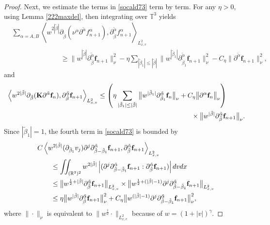\documentclass[reqno]{amsart}
\numberwithin{equation}{section}
\numberwithin{equation}{section}
\begin{document}
\begin{proof}
		
		‌Next, we estimate the terms in \eqref{socald73} term by term. For any \(\eta > 0\), using Lemma \ref{222maxdel}, then integrating over \(\mathbb{T}^3\) yields
		\begin{align*}
			&\sum_{\alpha=A,B}\left\langle w^{2|\tilde{\beta}|}\partial_{\tilde{\beta}} (\nu^{\alpha}\partial^{\tilde{\alpha}} f_{n+1}^{\alpha}), \partial_{\tilde{\beta}}^{\tilde{\alpha}} f_{n+1}^{\alpha} \right\rangle_{L^{2}_{x,v}} \\
			&\hspace{3cm}\geq \big\|w^{|\tilde{\beta}|}\partial_{\tilde{\beta}}^{\tilde{\alpha}} \mathbf{f}_{n+1}\big\|^2_{\nu} - \eta \sum_{|\tilde{\beta}_1| \leq |\tilde{\beta}|} \big\|w^{|\tilde{\beta}_1|}\partial_{\tilde{\beta}_1}^{\tilde{\alpha}} \mathbf{f}_{n+1}\big\|^2_{\nu} - C_\eta \big\|\partial^{\tilde{\alpha}} \mathbf{f}_{n+1}\big\|^2_{\nu},
		\end{align*}
		and
		\begin{align*}
		&\left\langle w^{2|\tilde{\beta}|}\partial_{\tilde{\beta}} (\mathbf{K}\partial^{\tilde{\alpha}} \mathbf{f}_n), \partial_{\tilde{\beta}}^{\tilde{\alpha}} \mathbf{f}_{n+1}\right\rangle_{L^{2}_{x,v}} \le \left( \eta\sum_{|\tilde{\beta}_1| \le |\tilde{\beta}|} \big\|w^{|\tilde{\beta}_1|}\partial_{\tilde{\beta}_1}^{\tilde{\alpha}} \mathbf{f}_{n}\big\|_{\nu} + C_\eta \big\|\partial^\alpha \mathbf{f}_{n}\big\|_{\nu} \right)\\ 
		&\hspace{9.6cm}\times \big\|w^{|\tilde{\beta}|}\partial_{\tilde{\beta}}^{\tilde{\alpha}} \mathbf{f}_{n+1}\big\|_{\nu}.
		\end{align*}
		Since \(|\tilde{\beta}_1| = 1\), the fourth term in \eqref{socald73} is bounded by
		\begin{align*}
		&C\left\langle w^{2|\tilde{\beta}|}(\partial_{\tilde{\beta}_1}v_j)\partial^j \partial^{\tilde{\alpha}}_{\tilde{\beta}-\tilde{\beta}_1} \mathbf{f}_{n+1}, \partial_{\tilde{\beta}}^{\tilde{\alpha}} \mathbf{f}_{n+1}\right\rangle_{L^{2}_{x,v}}\\
		&\hspace{0.7cm}\leq \iint_{(\mathbb{R}^3)^2} w^{2|\tilde{\beta}|} \left|(\partial^j \partial^{\tilde{\alpha}}_{\tilde{\beta}-\tilde{\beta}_1} \mathbf{f}_{n+1}: \partial_{\tilde{\beta}}^{\tilde{\alpha}} \mathbf{f}_{n+1})\right| dv dx\\
		&\hspace{0.7cm}\leq \big\|w^{\frac{1}{2} + |\tilde{\beta}|}\partial_{\tilde{\beta}}^{\tilde{\alpha}} \mathbf{f}_{n+1}\big\|_{L^{2}_{x,v}} \times \big\|w^{\frac{1}{2} + (|\tilde{\beta}| - 1)}\partial^j \partial^{\tilde{\alpha}}_{\tilde{\beta}-\tilde{\beta}_1} \mathbf{f}_{n+1}\big\|_{L^{2}_{x,v}}\\
		&\hspace{0.7cm}\leq \eta \big\|w^{ |\tilde{\beta}|}\partial_{\tilde{\beta}}^{\tilde{\alpha}} \mathbf{f}_{n+1}\big\|_{\nu}^2 + C_\eta \big\|w^{(|\tilde{\beta}| - 1)}\partial^j \partial^{\tilde{\alpha}}_{\tilde{\beta}-\tilde{\beta}_1} \mathbf{f}_{n+1}\big\|^2_{\nu},
		\end{align*}
		where \(\|\cdot\|_\nu\) is equivalent to \(\|w^{\frac{1}{2}}\cdot\|_{L^{2}_{x,v}}\) because of \(w = (1 + |v|)^\gamma\).
		

\end{proof}
\end{document}
